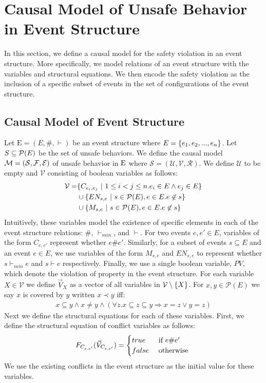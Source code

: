 \section{Causal Model of Unsafe Behavior in Event Structure}

In this section, we define a causal model for the safety violation
in an event structure. 
More specifically, we model relations of an event structure 
with the variables and structural equations. 
We then encode the safety violation as the inclusion of a specific
subset of events in the set of configurations of the event structure.


\subsection{Causal Model of Event Structure}
Let $\mathrm{E} = (E,\#,\vdash)$ be an event structure where
$E = \{e_1, e_2, ...,e_n\}$.
Let $S \subseteq \mathcal{P}(E)$ be the set of unsafe behaviors.
We define the causal model
$\mathcal{M} = (\mathcal{S},\mathcal{F},\mathcal{E})$ of unsafe behavior
in $\mathrm{E}$ where
$\mathcal{S} = (\mathcal{U},\mathcal{V},\mathcal{R})$.
We define $\mathcal{U}$ to be empty and $\mathcal{V}$
consisting of boolean variables as follows:
\begin{align*}
    \mathcal{V} = & \{C_{e_i,e_j} ~|~  1 \leq i < j \leq n.
    e_i \in E \wedge e_j \in E\}                                \\
                  & \cup \{EN_{s,e} ~|~ s \in \mathcal{P}(E),
    e \in E. e \not \in s \}                                    \\
                  & \cup \{M_{s,e} ~|~ s \in \mathcal{P}(E),
        e \in E. e \not \in s \}
\end{align*}
Intuitively, these variables model the existence of specific elements in
each of the event structure relations: $\#$, $\vdash_{min}$, and $\vdash$.
For two events $e,e' \in E$, variables of the form $C_{e,e'}$ represent whether $e\#e'$.
Similarly, for a subset of events $s \subseteq E$ and an event $e \in E$,
we use variables of the form $M_{s,e}$ and $EN_{s,e}$ to represent
whether $s \vdash_{min} e$ and $s \vdash e$ respectively.
Finally, we use a single boolean variable, $PV$, which denote the
violation of property in the event structure.
For each variable $X \in \mathcal{V}$ we define $\vec V_X$
as a vector of all variables in $\mathcal{V} \setminus \{X\}$.
For $x,y \in \mathcal{P}(E)$ we say $x$ is covered by $y$ written $ x \prec y$ iff:
\begin{align*}
    x \subseteq y \wedge x \neq y \wedge
    (\forall z. x \subseteq z \subseteq y \Rightarrow x = z
    \vee y = z)
\end{align*}
Next we define the structural equations for each of these variables.
First, we define the structural equation of conflict variables as 
follows:
$$
    F_{C_{e,e'}}(\vec V_{C_{e,e'}}) = \begin{cases}
        true  & \text{ if } e \# e' \\
        false & \text{ otherwise }
    \end{cases}
$$
We use the existing conflicts in the event structure as the initial 
value for these variables.

